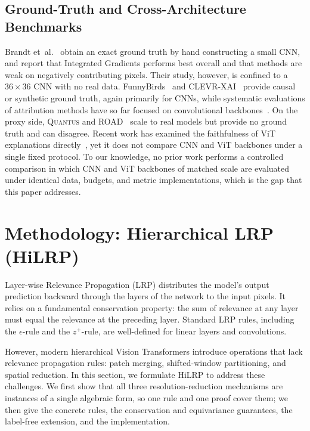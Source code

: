 \documentclass[lettersize,journal]{IEEEtran}
\begin{document}
\subsection{Ground-Truth and Cross-Architecture Benchmarks}
Brandt et~al.~\cite{brandt2023precise} obtain an exact ground truth by hand
constructing a small CNN, and report that Integrated Gradients performs best
overall and that methods are weak on negatively contributing pixels. Their study,
however, is confined to a $36\times36$ CNN with no real data.
FunnyBirds~\cite{hesse2023funnybirds} and CLEVR-XAI~\cite{arras2022clevrxai}
provide causal or synthetic ground truth, again primarily for CNNs, while
systematic evaluations of attribution methods have so far focused on convolutional
backbones~\cite{rao2022attribution}. On the proxy side, \textsc{Quantus}
\cite{hedstrom2023quantus} and ROAD~\cite{rong2022road} scale to real models but
provide no ground truth and can disagree. Recent work has examined the
faithfulness of ViT explanations directly~\cite{wu2024faithfulness}, yet it does
not compare CNN and ViT backbones under a single fixed protocol. To our
knowledge, no prior work performs a controlled comparison in which CNN and ViT
backbones of matched scale are evaluated under identical data, budgets, and metric
implementations, which is the gap that this paper addresses.

\section{Methodology: Hierarchical LRP (HiLRP)}
\label{sec:methodology}

Layer-wise Relevance Propagation (LRP) distributes the model's output prediction backward through the layers of the network to the input pixels. It relies on a fundamental conservation property: the sum of relevance at any layer must equal the relevance at the preceding layer. Standard LRP rules, including the $\epsilon$-rule and the $z^+$-rule, are well-defined for linear layers and convolutions.

However, modern hierarchical Vision Transformers introduce operations that lack relevance propagation rules: patch merging, shifted-window partitioning, and spatial reduction. In this section, we formulate HiLRP to address these challenges. We first show that all three resolution-reduction mechanisms are instances of a single algebraic form, so one rule and one proof cover them; we then give the concrete rules, the conservation and equivariance guarantees, the label-free extension, and the implementation.
\end{document}
